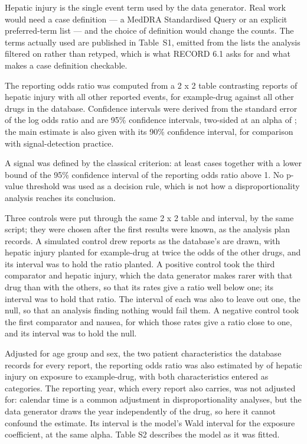 \documentclass{article}
\begin{document}
Hepatic injury is the single event term used by the data generator. Real work would need a
case definition --- a MedDRA Standardised Query or an explicit preferred-term list --- and the
choice of definition would change the counts. The terms actually used are published in
Table~S1, emitted from the lists the analysis filtered on rather than retyped, which is what
RECORD 6.1 asks for and what makes a case definition checkable.

The reporting odds ratio was computed from a 2 x 2 table contrasting reports of hepatic
injury with all other reported events, for example-drug against all other drugs in the
database. Confidence intervals were derived from the standard error of the log odds ratio
and are 95\% confidence intervals, two-sided at an alpha of ; the
main estimate is also given with its 90\% confidence interval, for comparison with
signal-detection practice.  

A signal was defined by the classical criterion: at least
 cases together with a lower bound of the 95\% confidence
interval of the reporting odds ratio above 1. No p-value threshold was used as a decision
rule, which is not how a disproportionality analysis reaches its conclusion.

Three controls were put through the same 2 x 2 table and interval, by the same script; they
were chosen after the first results were known, as the analysis plan records. A simulated
control drew reports as the database's are drawn, with hepatic injury planted for
example-drug at twice the odds of the other drugs, and its interval was to hold the ratio
planted. A positive control took the third comparator and hepatic injury, which the data
generator makes rarer with that drug than with the others, so that its rates give a ratio
well below one; its interval was to hold that ratio. The interval of each was also to leave
out one, the null, so that an analysis finding nothing would fail them. A negative control
took the first comparator and nausea, for which those rates give a ratio close to one, and
its interval was to hold the null. 

Adjusted for age group and sex, the two patient characteristics the database records for
every report, the reporting odds ratio was also estimated by 
of hepatic injury on exposure to example-drug, with both characteristics entered as
categories. The reporting year, which every report also carries, was not adjusted for:
calendar time is a common adjustment in disproportionality analyses, but the data generator
draws the year independently of the drug, so here it cannot confound the estimate. Its
interval is the model's Wald interval for the exposure coefficient, at the same alpha. Table
S2 describes the model as it was fitted. 
\end{document}
